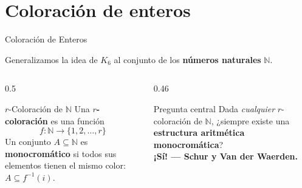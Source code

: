 
\section{Coloración de enteros}

\begin{frame}{Coloración de Enteros}

    \begin{center}
        Generalizamos la idea de $K_6$ al conjunto de los
        \textbf{números naturales} $\mathbb{N}$.
    \end{center}

    \vspace{0.2cm}

    \begin{center}
    \end{center}

    \vspace{0.15cm}

    \begin{columns}[T]
        \begin{column}{0.5\textwidth}
            \begin{block}{$r$-Coloración de $\mathbb{N}$}
                Una \textbf{$r$-coloración} es una función
                \[
                    f : \mathbb{N} \longrightarrow \{1, 2, \dots, r\}
                \]
                Un conjunto $A \subseteq \mathbb{N}$ es
                \textbf{monocromático} si todos sus elementos
                tienen el mismo color: $A \subseteq f^{-1}(i)$.
            \end{block}
        \end{column}
        \begin{column}{0.46\textwidth}
            \begin{alertblock}{Pregunta central}
                Dada \textit{cualquier} $r$-coloración de $\mathbb{N}$,
                ¿siempre existe una \textbf{estructura aritmética
                monocromática}?\\[4pt]
                \centering\textbf{¡Sí! — Schur y Van der Waerden.}
            \end{alertblock}
        \end{column}
    \end{columns}

\end{frame}
